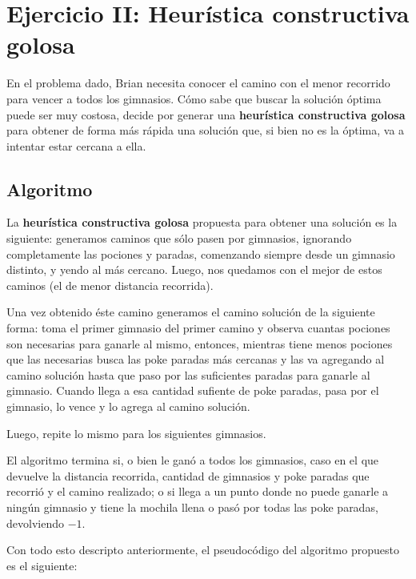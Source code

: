 \section{Ejercicio II: Heurística constructiva golosa}

En el problema dado, Brian necesita conocer el camino con el menor recorrido para vencer a todos los gimnasios. Cómo sabe que buscar la solución óptima puede ser muy costosa, decide por generar una \textbf{heurística constructiva golosa} para obtener de forma más rápida una solución que, si bien no es la óptima, va a intentar estar cercana a ella.

\subsection{Algoritmo}

La \textbf{heurística constructiva golosa} propuesta para obtener una solución es la siguiente: generamos caminos que sólo pasen por gimnasios, ignorando completamente las pociones y paradas, comenzando siempre desde un gimnasio distinto, y yendo al más cercano. Luego, nos quedamos con el mejor de estos caminos (el de menor distancia recorrida). 

Una vez obtenido éste camino generamos el camino solución de la siguiente forma: toma el primer gimnasio del primer camino y observa cuantas pociones son necesarias para ganarle al mismo, entonces, mientras tiene menos pociones que las necesarias busca las poke paradas más cercanas y las va agregando al camino solución hasta que paso por las suficientes paradas para ganarle al gimnasio. Cuando llega a esa cantidad sufiente de poke paradas, pasa por el gimnasio, lo vence y lo agrega al camino solución.

Luego, repite lo mismo para los siguientes gimnasios.

El algoritmo termina si, o bien le ganó a todos los gimnasios, caso en el que devuelve la distancia recorrida, cantidad de gimnasios y poke paradas que recorrió y el camino realizado; o si llega a un punto donde no puede ganarle a ningún gimnasio y tiene la mochila llena o pasó por todas las poke paradas, devolviendo $-1$.


Con todo esto descripto anteriormente, el pseudocódigo del algoritmo propuesto es el siguiente:

